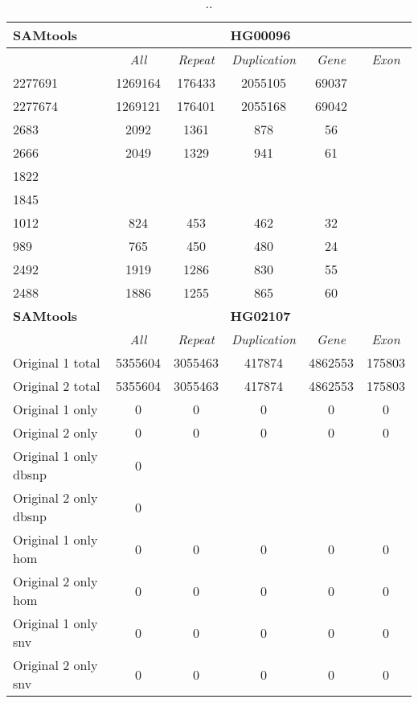 \begin{table}[htb]
\begin{center}
\begin{tabular}{|l|c||c|c|c|c|}
\hline
{\bf SAMtools} & \multicolumn{5}{|c|}{\bf HG00096} \\
\hline
\cline{2-6}
{\bf} & {\it All} & {\it Repeat} & {\it Duplication} & {\it Gene} & {\it Exon} \\
\hline
2277691 & 1269164 & 176433 & 2055105 & 69037\\ 
\hline
2277674 & 1269121 & 176401 & 2055168 & 69042\\ 
\hline
2683 & 2092 & 1361 & 878 & 56\\ 
\hline
2666 & 2049 & 1329 & 941 & 61\\ 
\hline
1822 &  &  &  & \\ 
\hline
1845 &  &  &  & \\ 
\hline
1012 & 824 & 453 & 462 & 32\\ 
\hline
989 & 765 & 450 & 480 & 24\\ 
\hline
2492 & 1919 & 1286 & 830 & 55\\ 
\hline
2488 & 1886 & 1255 & 865 & 60\\ 
\hline
\hline
{\bf SAMtools} & \multicolumn{5}{|c|}{\bf HG02107} \\
\hline
\cline{2-6}
{\bf} & {\it All} & {\it Repeat} & {\it Duplication} & {\it Gene} & {\it Exon} \\
\hline
Original 1 total & 5355604 & 3055463 & 417874 & 4862553 & 175803\\ 
\hline
Original 2 total & 5355604 & 3055463 & 417874 & 4862553 & 175803\\ 
\hline
Original 1 only & 0 & 0 & 0 & 0 & 0\\ 
\hline
Original 2 only & 0 & 0 & 0 & 0 & 0\\ 
\hline
Original 1 only dbsnp & 0 &  &  &  & \\ 
\hline
Original 2 only dbsnp & 0 &  &  &  & \\ 
\hline
Original 1 only hom & 0 & 0 & 0 & 0 & 0\\ 
\hline
Original 2 only hom & 0 & 0 & 0 & 0 & 0\\ 
\hline
Original 1 only snv & 0 & 0 & 0 & 0 & 0\\ 
\hline
Original 2 only snv & 0 & 0 & 0 & 0 & 0\\ 
\hline
\end{tabular}
\end{center}
\caption{ .. }
\label{tab:orig-vs-shuf-samtools}
\end{table}

